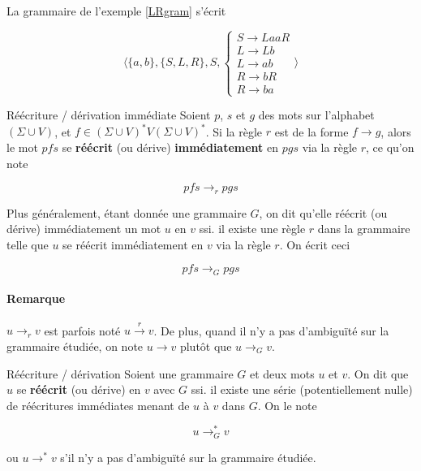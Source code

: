 \begin{example}
La grammaire de l'exemple \ref{LRgram} s'écrit 

\[
\big \langle \{a,b\},\{S,L,R\},S, \begin{cases}
S \rightarrow LaaR \\
L \rightarrow Lb \\
L \rightarrow ab \\
R \rightarrow bR \\
R \rightarrow ba
\end{cases}
 \big \rangle
\]


\begin{definition}{Réécriture / dérivation immédiate}{}
Soient $p$, $s$ et $g$ des mots sur l'alphabet $(\Sigma \cup V)$, et $f \in (\Sigma \cup V)^*V(\Sigma \cup V)^*$. Si la règle $r$ est de la forme $f \rightarrow g$, alors le mot $pfs$ se \textbf{réécrit} (ou dérive) \textbf{immédiatement} en $pgs$ via la règle $r$, ce qu'on note 

\[
pfs \rightarrow_r pgs
\]

Plus généralement, étant donnée une grammaire $G$, on dit qu'elle réécrit (ou dérive) immédiatement un mot $u$ en $v$ ssi. il existe une règle $r$ dans la grammaire telle que $u$ se réécrit immédiatement en $v$ via la règle $r$. On écrit ceci 

\[
pfs \rightarrow_G pgs
\]
\end{definition}

\paragraph{Remarque} $u \rightarrow_r v$ est parfois noté $u \xrightarrow{r} v$. De plus, quand il n'y a pas d'ambiguïté sur la grammaire étudiée, on note $u \rightarrow v$ plutôt que $u \rightarrow_G v$.


\end{example}


\begin{definition}{Réécriture / dérivation}{}
Soient une grammaire $G$ et deux mots $u$ et $v$. On dit que $u$ se \textbf{réécrit} (ou dérive) en $v$ avec $G$ ssi. il existe une série (potentiellement nulle) de réécritures immédiates menant de $u$ à $v$ dans $G$. On le note 

\[
u \rightarrow_G^* v
\]

ou $u \rightarrow^* v$ s'il n'y a pas d'ambiguïté sur la grammaire étudiée.

\end{definition}
 
